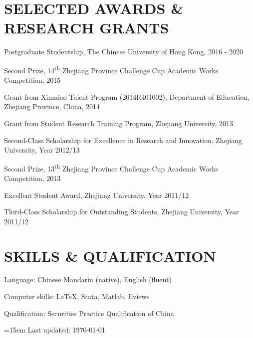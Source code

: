 \documentclass{res} 			%
\begin{document}
\begin{resume}
\section{SELECTED AWARDS \& RESEARCH GRANTS} 
\vspace{0.1in}
   Postgraduate Studentship, The Chinese University of Hong Kong, 2016 - 2020
   
   Second Prize, 14\textsuperscript{th} Zhejiang Province Challenge Cup Academic Works Competition, 2015
   
   Grant from Xinmiao Talent Program (2014R401002), Department of Education, Zhejiang Province, China, 2014
   
   Grant from Student Research Training Program, Zhejiang University, 2013
   
   Second-Class Scholarship for Excellence in Research and Innovation, Zhejiang University, Year 2012/13
   
   Second Prize, 13\textsuperscript{th} Zhejiang Province Challenge Cup Academic Works Competition, 2013
   
   Excellent Student Award, Zhejiang University, Year 2011/12
   
   Third-Class Scholarship for Outstanding Students, Zhejiang University, Year 2011/12


\section{SKILLS \& QUALIFICATION} 
\vspace{0.1in}
   Language: Chinese Mandarin (native), English (fluent)

   Computer skills: \LaTeX, Stata, Matlab, Eviews
   
   Qualification: Securities Practice Qualification of China


\end{resume}

\vspace{0.5in}
\leftskip=15em Last updated: \today
\end{document}
